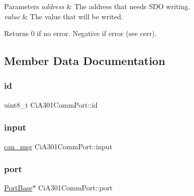 \begin{DoxyParams}{Parameters}
{\em address} & The address that needs S\+DO writing. \\
\hline
{\em value} & The value that will be writed. \\
\hline
\end{DoxyParams}
\begin{DoxyReturn}{Returns}
0 if no error. Negative if error (see cerr). 
\end{DoxyReturn}


\subsection{Member Data Documentation}
\mbox{\label{classCiA301CommPort_a1ae075d22fc854da21a6e691bb029fc0}} 
\subsubsection{\texorpdfstring{id}{id}}
{\footnotesize\ttfamily uint8\+\_\+t Ci\+A301\+Comm\+Port\+::id\hspace{0.3cm}{\ttfamily [private]}}

\mbox{\label{classCiA301CommPort_ae0f955c7141e2067307cea0b48e111d4}} 
\subsubsection{\texorpdfstring{input}{input}}
{\footnotesize\ttfamily \hyperlink{structcan__msg}{can\+\_\+msg} Ci\+A301\+Comm\+Port\+::input\hspace{0.3cm}{\ttfamily [private]}}

\mbox{\label{classCiA301CommPort_a6b8366387075c99ee980d2ca79c7b7fc}} 
\subsubsection{\texorpdfstring{port}{port}}
{\footnotesize\ttfamily \hyperlink{classPortBase}{Port\+Base}$\ast$ Ci\+A301\+Comm\+Port\+::port\hspace{0.3cm}{\ttfamily [private]}}

